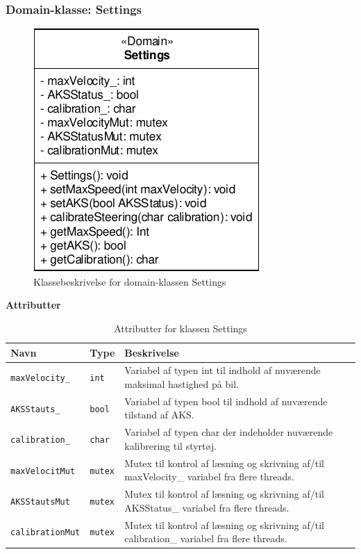 \subsubsection{Domain-klasse: Settings}

\begin{figure}[h]
\centering
\includegraphics[]{../fig/diagrammer/bil/cd_settings.pdf}
\caption{Klassebeskrivelse for domain-klassen Settings}
\label{fig:cd_settings}
\end{figure}

\textbf{Attributter}

\begin{table}[h]
\begin{tabularx}{\textwidth}{| L{3cm} | Z | L{10cm} |} \hline
Navn & Type & Beskrivelse \\\hline
\texttt{maxVelocity\_}			& \texttt{int}		&Variabel af typen int til indhold af nuværende maksimal hastighed på bil.\\\hline

\texttt{AKSStauts\_}			& \texttt{bool}		&Variabel af typen bool til indhold af nuværende tilstand af AKS.\\\hline

\texttt{calibration\_}			& \texttt{char}		&Variabel af typen char der indeholder nuværende kalibrering til styrtøj.\\\hline

\texttt{maxVelocitMut}			& \texttt{mutex}	&Mutex til kontrol af læsning og skrivning af/til maxVelocity\_ variabel fra flere threads.\\\hline

\texttt{AKSStautsMut}			& \texttt{mutex}	&Mutex til kontrol af læsning og skrivning af/til AKSStatus\_ variabel fra flere threads.\\\hline

\texttt{calibrationMut}			& \texttt{mutex}	&Mutex til kontrol af læsning og skrivning af/til calibration\_ variabel fra flere threads.\\\hline
\end{tabularx}
\caption{Attributter for klassen Settings}
\label{table:attr_settings}
\end{table}

